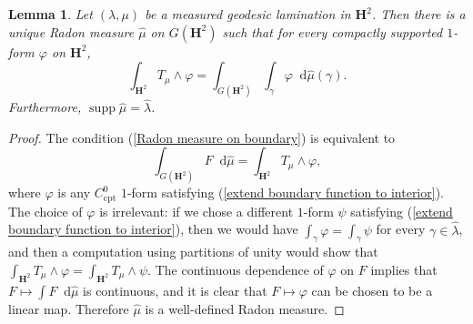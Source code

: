 \documentclass[reqno,11pt]{amsart}
\newcommand{\Hyp}{\mathbf H}
\newcommand*\dif{\mathop{}\!\mathrm{d}}
\DeclareMathOperator{\supp}{supp}
\newcommand{\cpt}{\mathrm{cpt}}
\newtheorem{lemma}[theorem]{Lemma}
\theoremstyle{definition}
\numberwithin{equation}{section}
\begin{document}
\begin{lemma}\label{existence of boundary measure}
Let $(\lambda, \mu)$ be a measured geodesic lamination in $\Hyp^2$.
Then there is a unique Radon measure $\hat \mu$ on $G(\Hyp^2)$ such that for every compactly supported $1$-form $\varphi$ on $\Hyp^2$,
\begin{equation}\label{Radon measure on boundary}
\int_{\Hyp^2} T_\mu \wedge \varphi = \int_{G(\Hyp^2)} \int_\gamma \varphi \dif \hat \mu(\gamma).
\end{equation}
Furthermore, $\supp \hat \mu = \hat \lambda$.
\end{lemma}
\begin{proof}
The condition (\ref{Radon measure on boundary}) is equivalent to
$$\int_{G(\Hyp^2)} F \dif \hat \mu = \int_{\Hyp^2} T_\mu \wedge \varphi,$$
where $\varphi$ is any $C^0_\cpt$ $1$-form satisfying (\ref{extend boundary function to interior}).
The choice of $\varphi$ is irrelevant: if we chose a different $1$-form $\psi$ satisfying (\ref{extend boundary function to interior}), then we would have $\int_\gamma \varphi = \int_\gamma \psi$ for every $\gamma \in \hat \lambda$, and then a computation using partitions of unity would show that $\int_{\Hyp^2} T_\mu \wedge \varphi = \int_{\Hyp^2} T_\mu \wedge \psi$.
The continuous dependence of $\varphi$ on $F$ implies that $F \mapsto \int F \dif \hat \mu$ is continuous, and it is clear that $F \mapsto \varphi$ can be chosen to be a linear map.
Therefore $\hat \mu$ is a well-defined Radon measure.
\end{proof}
\end{document}
